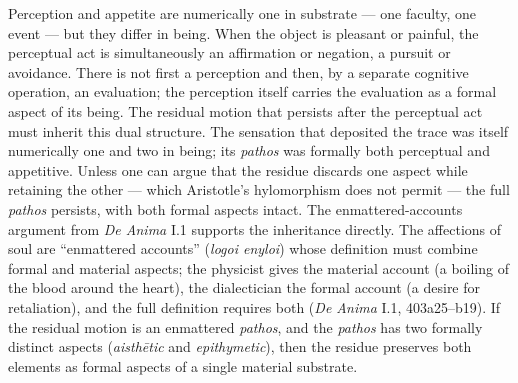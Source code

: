 \documentclass{article}
\begin{document}
Perception and appetite are numerically one in substrate --- one faculty, one event --- but they differ in being. When the object is pleasant or painful, the perceptual act is simultaneously an affirmation or negation, a pursuit or avoidance. There is not first a perception and then, by a separate cognitive operation, an evaluation; the perception itself carries the evaluation as a formal aspect of its being. The residual motion that persists after the perceptual act must inherit this dual structure. The sensation that deposited the trace was itself numerically one and two in being; its \textit{pathos} was formally both perceptual and appetitive. Unless one can argue that the residue discards one aspect while retaining the other --- which Aristotle's hylomorphism does not permit --- the full \textit{pathos} persists, with both formal aspects intact. The enmattered-accounts argument from \textit{De Anima} I.1 supports the inheritance directly. The affections of soul are ``enmattered accounts'' (\textit{logoi enyloi}) whose definition must combine formal and material aspects; the physicist gives the material account (a boiling of the blood around the heart), the dialectician the formal account (a desire for retaliation), and the full definition requires both (\textit{De Anima} I.1, 403a25--b19). If the residual motion is an enmattered \textit{pathos}, and the \textit{pathos} has two formally distinct aspects (\textit{aisthētic} and \textit{epithymetic}), then the residue preserves both elements as formal aspects of a single material substrate.
\end{document}
